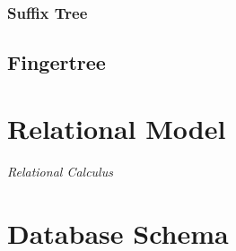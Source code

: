 \subsubsection{Suffix Tree}\label{sec:suffix_tree}



\subsection{Fingertree}\label{sec:fingertree}



\section{Relational Model}\label{sec:relational_model}

\emph{Relational Calculus}

\section{Database Schema}\label{sec:database_schema}
